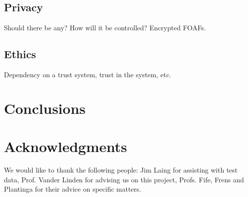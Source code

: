 \documentclass{acm_proc_article-sp}
\begin{document}
\subsection{Privacy}
Should there be any?  How will it be controlled?
Encrypted FOAFs.

\subsection{Ethics}
Dependency on a trust system, trust in the system, etc.

\section{Conclusions}


\section{Acknowledgments}
We would like to thank the following people:  Jim Laing for assisting with test data, Prof. Vander Linden for advising us on this project, Profs. Fife, Frens and Plantinga for their advice on specific matters.

%

  
%
%

\balancecolumns

\end{document}
